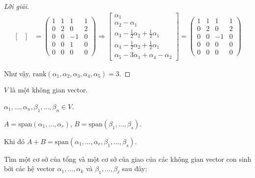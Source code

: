 \documentclass[class=linearalgebra,crop=false]{standalone}
\begin{document}
\begin{proof}[Lời giải]
\begin{align*}
\begin{bmatrix}
        \end{bmatrix} & =
        \begin{pmatrix}
            1 & 1 & 1  & 1 \\
            0 & 2 & 0  & 2 \\
            0 & 0 & -1 & 0 \\
            0 & 0 & 1  & 0 \\
            0 & 0 & 0  & 0
        \end{pmatrix}
        \Longrightarrow
        \begin{bmatrix}
            \alpha_{1}                                                 \\
            \alpha_{2}-\alpha_{1}                                      \\
            \alpha_{3}-\frac{1}{2}\alpha_{2}+\frac{1}{2}\alpha_{1}     \\
            \alpha_{4} - \frac{1}{2}\alpha_{2} + \frac{1}{2}\alpha_{1} \\
            \alpha_{5} - 3\alpha_{1} + \alpha_{4} - \alpha_{2}
        \end{bmatrix}=
        \begin{pmatrix}
            1 & 1 & 1  & 1 \\
            0 & 2 & 0  & 2 \\
            0 & 0 & -1 & 0 \\
            0 & 0 & 0  & 0 \\
            0 & 0 & 0  & 0
        \end{pmatrix}
    \end{align*}
    \par Như vậy, $\text{rank}(\alpha_{1},\alpha_{2},\alpha_{3},\alpha_{4},\alpha_{5}) = 3$.
\end{proof}


\begin{lemma}
    $V$ là một không gian vector.
    \par $\alpha_{1},\ldots,\alpha_{n},\beta_{1},\ldots,\beta_{n}\in V$.
    \par $A = \text{span}(\alpha_{1},\ldots,\alpha_{r})$, $B = \text{span}(\beta_{1},\ldots,\beta_{s})$.
    \par Khi đó $A + B = \text{span}(\alpha_{1},\ldots,\alpha_{r},\beta_{1},\ldots,\beta_{s})$.
\end{lemma}

\par Tìm một cơ sở của tổng và một cơ sở của giao của các không gian vector con sinh bởi các hệ vector $\alpha_{1},\ldots,\alpha_{k}$ và $\beta_{1},\ldots,\beta_{\ell}$ sau đây:
\end{document}
